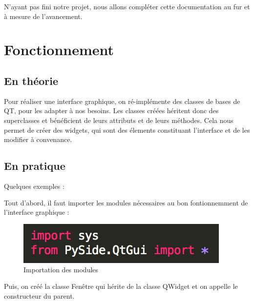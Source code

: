 \documentclass[a4paper,12pt]{article}
\begin{document}
N'ayant pas fini notre projet, nous allons compléter cette documentation au fur et à mesure de l'avancement.

\section{Fonctionnement}

	\subsection{En théorie}

		Pour réaliser une interface graphique, on ré-implémente des classes de bases de QT, pour les adapter à nos besoins. Les classes créées héritent donc des superclasses et bénéficient de leurs attributs et de leurs méthodes. Cela nous permet de créer des widgets, qui sont des élements constituant l'interface et de les modifier à convenance.

	\subsection{En pratique} 

		Quelques exemples :

		Tout d'abord, il faut importer les modules nécessaires au bon fontionnemment de l'interface graphique :

		\begin{figure}[!h]

			\begin{center}

				\includegraphics[scale=1]{"images/Import"}

				\caption{Importation des modules}

			\end{center}

		\end{figure}

		Puis, on créé la classe Fenêtre qui hérite de la classe QWidget et on appelle le constructeur du parent.
\end{document}
